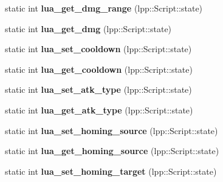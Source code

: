 \begin{DoxyCompactItemize}
\item 
static int {\bfseries lua\+\_\+get\+\_\+dmg\+\_\+range} (lpp\+::\+Script\+::state)\hypertarget{class_lua_interface_af6a3b405c1a1613013b7c02a385ff559}{}\label{class_lua_interface_af6a3b405c1a1613013b7c02a385ff559}

\item 
static int {\bfseries lua\+\_\+get\+\_\+dmg} (lpp\+::\+Script\+::state)\hypertarget{class_lua_interface_abff45ed95bbf096223b624b7f2fb785c}{}\label{class_lua_interface_abff45ed95bbf096223b624b7f2fb785c}

\item 
static int {\bfseries lua\+\_\+set\+\_\+cooldown} (lpp\+::\+Script\+::state)\hypertarget{class_lua_interface_a7e5d131d40785a1baf4d4d72409a9053}{}\label{class_lua_interface_a7e5d131d40785a1baf4d4d72409a9053}

\item 
static int {\bfseries lua\+\_\+get\+\_\+cooldown} (lpp\+::\+Script\+::state)\hypertarget{class_lua_interface_a7e44d375fe35d074c6e683d0c575a2a4}{}\label{class_lua_interface_a7e44d375fe35d074c6e683d0c575a2a4}

\item 
static int {\bfseries lua\+\_\+set\+\_\+atk\+\_\+type} (lpp\+::\+Script\+::state)\hypertarget{class_lua_interface_a27c8f09c3815ee53f99ba111f09302f0}{}\label{class_lua_interface_a27c8f09c3815ee53f99ba111f09302f0}

\item 
static int {\bfseries lua\+\_\+get\+\_\+atk\+\_\+type} (lpp\+::\+Script\+::state)\hypertarget{class_lua_interface_a7ea627c8ffb11d5ab782e75dd10307c0}{}\label{class_lua_interface_a7ea627c8ffb11d5ab782e75dd10307c0}

\item 
static int {\bfseries lua\+\_\+set\+\_\+homing\+\_\+source} (lpp\+::\+Script\+::state)\hypertarget{class_lua_interface_a9b0c4937b7cae1632f463d96d5cd28f2}{}\label{class_lua_interface_a9b0c4937b7cae1632f463d96d5cd28f2}

\item 
static int {\bfseries lua\+\_\+get\+\_\+homing\+\_\+source} (lpp\+::\+Script\+::state)\hypertarget{class_lua_interface_ae60bb0854a7b381917d40d58b601d878}{}\label{class_lua_interface_ae60bb0854a7b381917d40d58b601d878}

\item 
static int {\bfseries lua\+\_\+set\+\_\+homing\+\_\+target} (lpp\+::\+Script\+::state)\hypertarget{class_lua_interface_ae4a6ffada13b6c9728f2ecc7ff651fc4}{}\label{class_lua_interface_ae4a6ffada13b6c9728f2ecc7ff651fc4}


\end{DoxyCompactItemize}
